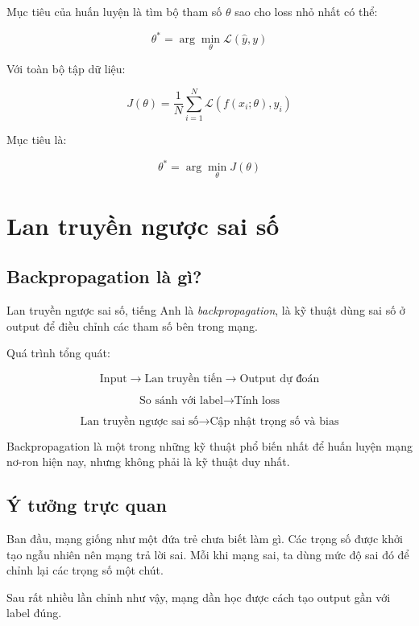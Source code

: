 \documentclass[12pt,a4paper]{report}
\begin{document}
Mục tiêu của huấn luyện là tìm bộ tham số $\theta$ sao cho loss nhỏ nhất có thể:

\[
    \theta^* = \arg\min_{\theta} \mathcal{L}(\hat{y},y)
\]

Với toàn bộ tập dữ liệu:

\[
    J(\theta)=\frac{1}{N}\sum_{i=1}^{N}\mathcal{L}\left(f(x_i;\theta),y_i\right)
\]

Mục tiêu là:

\[
    \theta^* = \arg\min_{\theta} J(\theta)
\]

\chapter{Lan truyền ngược sai số}

\section{Backpropagation là gì?}

Lan truyền ngược sai số, tiếng Anh là \textit{backpropagation}, là kỹ thuật dùng sai số ở output để điều chỉnh các tham số bên trong mạng.

Quá trình tổng quát:

\[
    \text{Input} \rightarrow \text{Lan truyền tiến} \rightarrow \text{Output dự đoán}
\]

\[
    \text{So sánh với label} \rightarrow \text{Tính loss}
\]

\[
    \text{Lan truyền ngược sai số} \rightarrow \text{Cập nhật trọng số và bias}
\]

\begin{ghinho}
Backpropagation là một trong những kỹ thuật phổ biến nhất để huấn luyện mạng nơ-ron hiện nay, nhưng không phải là kỹ thuật duy nhất.
\end{ghinho}

\section{Ý tưởng trực quan}

Ban đầu, mạng giống như một đứa trẻ chưa biết làm gì. Các trọng số được khởi tạo ngẫu nhiên nên mạng trả lời sai. Mỗi khi mạng sai, ta dùng mức độ sai đó để chỉnh lại các trọng số một chút.

Sau rất nhiều lần chỉnh như vậy, mạng dần học được cách tạo output gần với label đúng.
\end{document}
